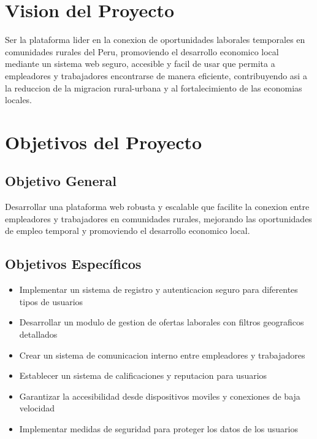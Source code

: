 \documentclass[12pt, a4paper]{article}
\begin{document}
\section{Vision del Proyecto}

\hspace{1.27cm}Ser la plataforma lider en la conexion de oportunidades laborales temporales en comunidades rurales del Peru, promoviendo el desarrollo economico local mediante un sistema web seguro, accesible y facil de usar que permita a empleadores y trabajadores encontrarse de manera eficiente, contribuyendo asi a la reduccion de la migracion rural-urbana y al fortalecimiento de las economias locales.

\section{Objetivos del Proyecto}

\subsection{Objetivo General}

\hspace{1.27cm}Desarrollar una plataforma web robusta y escalable que facilite la conexion entre empleadores y trabajadores en comunidades rurales, mejorando las oportunidades de empleo temporal y promoviendo el desarrollo economico local.

\subsection{Objetivos Específicos}

\begin{itemize}
    \item Implementar un sistema de registro y autenticacion seguro para diferentes tipos de usuarios
    \item Desarrollar un modulo de gestion de ofertas laborales con filtros geograficos detallados
    \item Crear un sistema de comunicacion interno entre empleadores y trabajadores
    \item Establecer un sistema de calificaciones y reputacion para usuarios
    \item Garantizar la accesibilidad desde dispositivos moviles y conexiones de baja velocidad
    \item Implementar medidas de seguridad para proteger los datos de los usuarios
\end{itemize}
\end{document}
